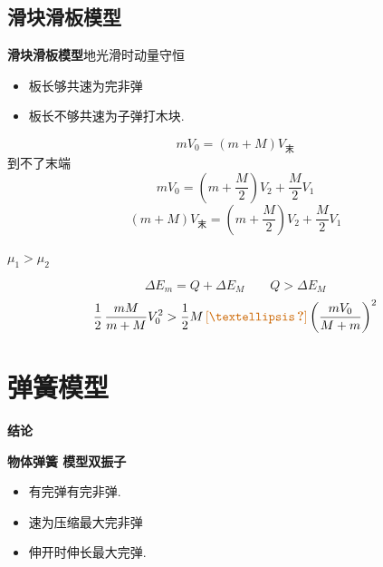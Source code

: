 \subsection{滑块滑板模型}
\textbf{滑块滑板模型}\quad 地光滑时动量守恒
\begin{itemize}
\item 板长够共速为完非弹
\item 板长不够共速为子弹打木块.
\end{itemize}

\[ mV_0=(m+M)V_{\text{末}} \]
到不了末端
\[ mV_0=\left(m+\dfrac{M}{2}\right)V_2+\dfrac{M}{2}V_1 \]
\[ (m+M)V_{\text{末}}=\left(m+\dfrac{M}{2}\right)V_2+\dfrac{M}{2}V_1 \]

\begin{problem}
$\mu_1>\mu_2$
\begin{solution}
\[ \Delta E_m=Q+\Delta E_M\qquad Q>\Delta E_M \]
\[ \frac12\,\frac{mM}{m+M}V_0^2>\frac12M\,\unclear{…}\left(\frac{mV_0}{M+m}\right)^2 \] %
\end{solution}
\end{problem}


\section{弹簧模型}
\textbf{结论}


\textbf{物体弹簧 模型\quad 双振子}
\begin{itemize}
\item 有完弹\quad 有完非弹.
\item {}速为压缩最大\quad 完非弹 %
\item 伸开时伸长最大\quad 完弹. %
\end{itemize}

